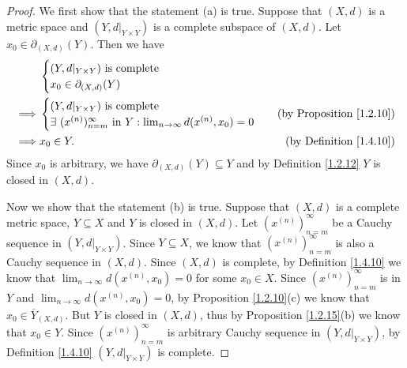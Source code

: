 \begin{proof}
    We first show that the statement (a) is true.
    Suppose that \((X, d)\) is a metric space and \((Y, d|_{Y \times Y})\) is a complete subspace of \((X, d)\).
    Let \(x_0 \in \partial_{(X, d)}(Y)\).
    Then we have
    \begin{align*}
                 & \begin{cases}
                       (Y, d|_{Y \times Y}) \text{ is complete} \\
                       x_0 \in \partial_{(X, d)}(Y)
                   \end{cases}                                                                                        \\
        \implies & \begin{cases}
                       (Y, d|_{Y \times Y}) \text{ is complete} \\
                       \exists\ (x^{(n)})_{n = m}^\infty \text{ in } Y : \lim_{n \to \infty} d(x^{(n)}, x_0) = 0
                   \end{cases} & \text{(by Proposition \ref{1.2.10})}                                        \\
        \implies & x_0 \in Y.                                                                                & \text{(by Definition \ref{1.4.10})}
    \end{align*}
    Since \(x_0\) is arbitrary, we have \(\partial_{(X, d)}(Y) \subseteq Y\) and by Definition \ref{1.2.12} \(Y\) is closed in \((X, d)\).

    Now we show that the statement (b) is true.
    Suppose that \((X, d)\) is a complete metric space, \(Y \subseteq X\) and \(Y\) is closed in \((X, d)\).
    Let \((x^{(n)})_{n = m}^\infty\) be a Cauchy sequence in \((Y, d|_{Y \times Y})\).
    Since \(Y \subseteq X\), we know that \((x^{(n)})_{n = m}^\infty\) is also a Cauchy sequence in \((X, d)\).
    Since \((X, d)\) is complete, by Definition \ref{1.4.10} we know that \(\lim_{n \to \infty} d(x^{(n)}, x_0) = 0\) for some \(x_0 \in X\).
    Since \((x^{(n)})_{n = m}^\infty\) is in \(Y\) and \(\lim_{n \to \infty} d(x^{(n)}, x_0) = 0\), by Proposition \ref{1.2.10}(c) we know that \(x_0 \in \overline{Y}_{(X, d)}\).
    But \(Y\) is closed in \((X, d)\), thus by Proposition \ref{1.2.15}(b) we know that \(x_0 \in Y\).
    Since \((x^{(n)})_{n = m}^\infty\) is arbitrary Cauchy sequence in \((Y, d|_{Y \times Y})\), by Definition \ref{1.4.10} \((Y, d|_{Y \times Y})\) is complete.
\end{proof}

